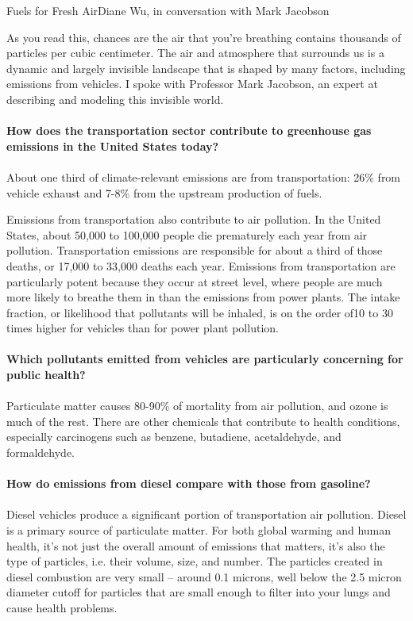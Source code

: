 \documentclass{papertex}
\begin{document}
\begin{news}{2}{Fuels for Fresh Air}{Diane Wu, in conversation with Mark Jacobson}{}{}

As you read this, chances are the air that you’re breathing contains thousands of particles per cubic centimeter. The air and atmosphere that surrounds us is a dynamic and largely invisible landscape that is shaped by many factors, including emissions from vehicles. I spoke with Professor Mark Jacobson, an expert at describing and modeling this invisible world.
\\
\\
\textbf{How does the transportation sector contribute to greenhouse gas 
    emissions in the United States today?}
\\
\\
About one third of climate-relevant emissions are from transportation: 26\% 
from vehicle exhaust and 7-8\% from the upstream production of fuels.

Emissions from transportation also contribute to air pollution. In the United 
States, about 50,000 to 100,000 people die prematurely each year from air 
pollution. Transportation emissions are responsible for about a third of those 
deaths, or 17,000 to 33,000 deaths each year. Emissions from transportation 
are particularly potent because they occur at street level, where people are 
much more likely to breathe them in than the emissions from power plants. The 
intake fraction, or likelihood that pollutants will be inhaled, is on the 
order of10 to 30 times higher for vehicles than for power plant pollution.
\\
\\
\textbf{Which pollutants emitted from vehicles are particularly concerning for 
    public health?}
\\
\\
Particulate matter causes 80-90\% of mortality from air pollution, and ozone 
is much of the rest. There are other chemicals that contribute to health 
conditions, especially carcinogens such as benzene, butadiene, acetaldehyde, 
and formaldehyde.
\\
\\
\textbf{How do emissions from diesel compare with those from gasoline?}
\\
\\
Diesel vehicles produce a significant portion of transportation air pollution. 
Diesel is a primary source of particulate matter. For both global warming and 
human health, it’s not just the overall amount of emissions that matters, it’s 
also the type of particles, i.e. their volume, size, and number. The particles 
created in diesel combustion are very small – around 0.1 microns, well below 
the 2.5 micron diameter cutoff for particles that are small enough to filter 
into your lungs and cause health problems.


\end{news}
\end{document}
